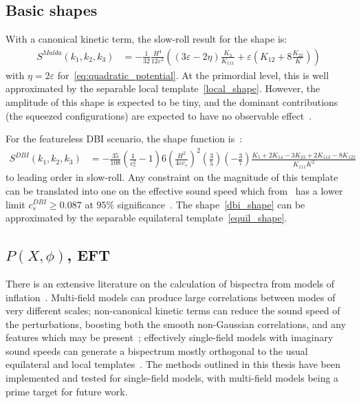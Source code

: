     \subsection{Basic shapes}
    With a canonical kinetic term, the slow-roll result for the shape is:
\begin{align}\label{malda_shape}
    S^{Malda}(k_1,k_2,k_3) &= -\frac{1}{32}\frac{H^4}{12\varepsilon^2} \left( (3\varepsilon-2\eta)\frac{K_3}{K_{111}}+\varepsilon \left(K_{12}+8\frac{K_{22}}{K}\right) \right)
\end{align}
with $\eta=2\varepsilon$ for~\eqref{eq:quadratic_potential}.
At the primordial level, this is well approximated by the separable local template~\eqref{local_shape}.
However, the amplitude of this shape is expected to be tiny,
and the dominant contributions (the squeezed configurations) are expected
to have no observable effect~\cite{Cabass_2016}.


For the featureless DBI scenario, the shape function is~\cite{dbi_in_the_sky}:
\begin{align}\label{dbi_shape}
    S^{DBI}(k_1,k_2,k_3) &= -\frac{35}{108}
         \left(\frac{1}{c_s^2}-1\right)
         6\left(\frac{H^2}{4\varepsilon c_s}\right)^2
         \left(\frac{3}{5}\right)
         \left(-\frac{3}{7}\right)
         \frac{K_5+2K_{14}-3K_{23}+2K_{113}-8K_{122}}{K_{111}K^2}
\end{align}
to leading order in slow-roll.
Any constraint on the magnitude of this template can be translated into one 
on the effective sound speed which from \planck~has a lower limit $c_s^{DBI} \geq 0.087$
at $95\%$ significance~\cite{Planck_NG_2015}.
The shape~\eqref{dbi_shape} can be approximated by the separable equilateral template~\eqref{equil_shape}.

    \subsection{$P(X, \phi)$, EFT}
    There is an extensive literature on the calculation
of bispectra from models of inflation~\cite{chen_easther_lim_1,chen_easther_lim_2,chen_ng_0605,seery_ng_0503,px_burrage,adshead,flauger_pajer_resonant,features_bartolo,bdy_passaglia}.
Multi-field models can produce large
correlations between modes of very different scales;
non-canonical kinetic terms can reduce the sound speed of the perturbations,
boosting both the smooth non-Gaussian correlations, and any
features which may be present~\cite{dbi_adshead,dbi_in_the_sky,warp_features_dbi,dbi_silverstein,dbi_step_miranda,chen_folded_resonant,osc_avila};
effectively single-field models with imaginary sound speeds can generate a bispectrum
mostly orthogonal to the usual equilateral and local templates~\cite{RP_1}.
The methods outlined in this thesis have been implemented
and tested for single-field models,
with multi-field models being a prime target for future work.

